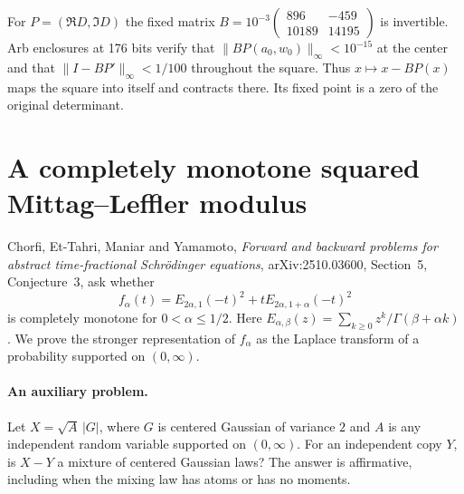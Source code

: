 \documentclass[11pt,a4paper]{article}
\numberwithin{equation}{section}
\begin{document}
For $P=(\Re D,\Im D)$ the fixed matrix
$B=10^{-3}\left(\begin{smallmatrix}896&-459\\10189&14195\end{smallmatrix}\right)$
is invertible. Arb enclosures at 176 bits verify that
$\|BP(a_0,w_0)\|_\infty<10^{-15}$ at the center and that
$\|I-BP'\|_\infty<1/100$ throughout the square.
Thus $x\mapsto x-BP(x)$ maps the square into itself and contracts
there. Its fixed point is a zero of the original determinant.


\section{A completely monotone squared Mittag--Leffler modulus}
\label{sec:schrod3}
Chorfi, Et-Tahri, Maniar and Yamamoto, \emph{Forward and backward problems for abstract time-fractional Schrödinger equations}, arXiv:2510.03600, Section~5, Conjecture~3, ask whether
\[
 f_\alpha(t)=E_{2\alpha,1}(-t)^2+tE_{2\alpha,1+\alpha}(-t)^2
\]
is completely monotone for $0<\alpha\leq 1/2$. Here $E_{\alpha,\beta}(z)=\sum_{k\ge0}z^k/\Gamma(\beta+\alpha k)$. We prove the stronger representation of $f_\alpha$ as the Laplace transform of a probability supported on $(0,\infty)$.

\paragraph{An auxiliary problem.}
Let $X=\sqrt{A}\,|G|$, where $G$ is centered Gaussian of variance $2$ and $A$ is any independent random variable supported on $(0,\infty)$. For an independent copy $Y$, is $X-Y$ a mixture of centered Gaussian laws? The answer is affirmative, including when the mixing law has atoms or has no moments.
\end{document}
